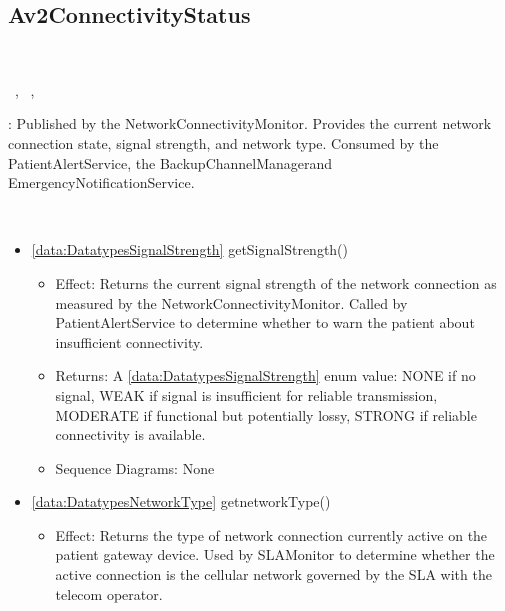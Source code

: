   \subsection{Av2ConnectivityStatus}\label{int:InterfacesAv2ConnectivityStatus}
    \begin{description}
      \item[Provided by:] \iconcomponent{}~
      \item[Required by:] \iconcomponent{}~, \iconcomponent{}~, \iconcomponent{}~ 
           \item[Description]: Published by the NetworkConnectivityMonitor. Provides the current network connection state, signal strength, and network type. Consumed by the PatientAlertService, the BackupChannelManagerand EmergencyNotificationService.
      \item[Operations:] ~
    \begin{itemize}[noitemsep,nolistsep,leftmargin=-.25cm]
      \item \textsf{\ref{data:DatatypesSignalStrength} getSignalStrength()}
        \begin{itemize}[noitemsep,nolistsep]
           \item Effect: Returns the current signal strength of the network connection as measured by the NetworkConnectivityMonitor. Called by PatientAlertService to determine whether to warn the patient about insufficient connectivity. 
           \item Returns: A \ref{data:DatatypesSignalStrength} enum value: NONE if no signal, WEAK if signal is insufficient for reliable transmission, MODERATE if functional but potentially lossy, STRONG if reliable connectivity is available.
           \item Sequence Diagrams: None
        \end{itemize}
      \item \textsf{\ref{data:DatatypesNetworkType} getnetworkType()}
        \begin{itemize}[noitemsep,nolistsep]
           \item Effect: Returns the type of network connection currently active on the patient gateway device. Used by SLAMonitor to determine whether the active connection is the cellular network governed by the SLA with the telecom operator. 

\end{itemize}
\end{itemize}
\end{description}
